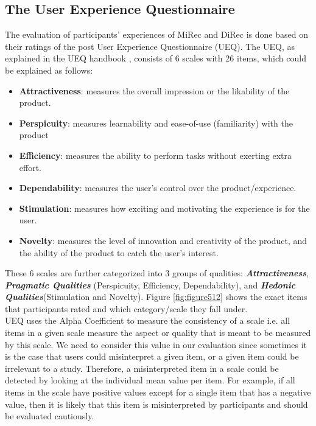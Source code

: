 \subsection{The User Experience Questionnaire}
The evaluation of participants' experiences of MiRec and DiRec is done based
on their ratings of the post User Experience Questionnaire (UEQ). The UEQ, as
explained in the UEQ handbook \cite{UEQHandbook}, consists of 6 scales with 26
items, which could be explained as follows:
\begin{itemize}
  \item \textbf{Attractiveness}: measures the overall impression or the
  likability of the product.
  \item \textbf{Perspicuity}: measures learnability and ease-of-use
  (familiarity) with the product
  \item \textbf{Efficiency}: measures the ability to perform tasks without
  exerting extra effort.
  \item \textbf{Dependability}: measures the user's control over the
  product/experience.
  \item \textbf{Stimulation}: measures how exciting and motivating the
  experience is for the user.
  \item \textbf{Novelty}: measures the level of innovation and creativity of the
  product, and the ability of the product to catch the user's interest.
\end{itemize}
These 6 scales are further categorized into 3 groups of qualities:
\textbf{\textit{Attractiveness}}, \textbf{\textit{Pragmatic
Qualities}} (Perspicuity, Efficiency, Dependability), and
\textbf{\textit{Hedonic Qualities}}(Stimulation and Novelty). Figure
\ref{fig:figure512} shows the exact items that participants rated and which
category/scale they fall under.\\
UEQ uses the Alpha Coefficient to measure the consistency of a scale i.e.
all items in a given scale  measure the aspect or quality that is meant to be
measured by this scale.
We need to consider this value in our evaluation since sometimes it is the case
that users could misinterpret a given item, or a given item could be irrelevant
to a study. Therefore, a misinterpreted item in a scale could be detected by
looking at the individual mean value per item. For example, if all items in the
scale have positive values except for a single item that has a negative value,
then it is likely that this item is misinterpreted by participants and should be
evaluated cautiously.\\
